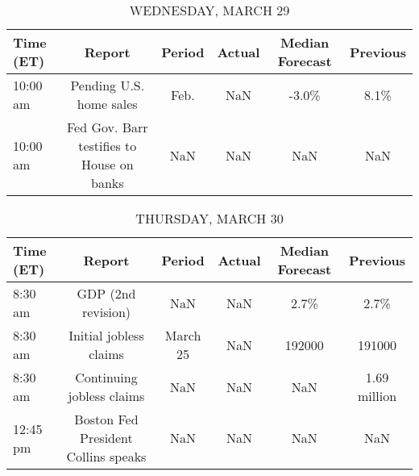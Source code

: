 \documentclass{article}%
\begin{document}
\begin{table}[htbp]%
\caption{WEDNESDAY, MARCH 29}%
\centering%
\begin{adjustbox}{width=1\textwidth}%
\begin{tabular}{lccccc}
\toprule
Time (ET) &                                    Report & Period & Actual & Median Forecast & Previous \\
\midrule
 10:00 am &                   Pending U.S. home sales &   Feb. &    NaN &           -3.0\% &     8.1\% \\
 10:00 am & Fed Gov. Barr testifies to House on banks &    NaN &    NaN &             NaN &      NaN \\
\bottomrule
\end{tabular}
%
\end{adjustbox}%
\end{table}

%


\begin{table}[htbp]%
\caption{THURSDAY, MARCH 30}%
\centering%
\begin{adjustbox}{width=1\textwidth}%
\begin{tabular}{lccccc}
\toprule
Time (ET) &                              Report &   Period & Actual & Median Forecast &     Previous \\
\midrule
  8:30 am &                  GDP (2nd revision) &      NaN &    NaN &            2.7\% &         2.7\% \\
  8:30 am &              Initial jobless claims & March 25 &    NaN &          192000 &       191000 \\
  8:30 am &           Continuing jobless claims &      NaN &    NaN &             NaN & 1.69 million \\
 12:45 pm & Boston Fed President Collins speaks &      NaN &    NaN &             NaN &          NaN \\
\bottomrule
\end{tabular}
%
\end{adjustbox}%
\end{table}

%
\end{document}
